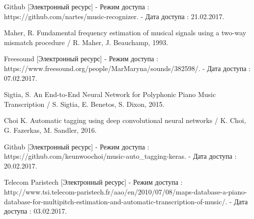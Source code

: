 \documentclass[oneside, final, 12pt]{extarticle}
\begin{document}
\begin{thebibliography}{0}
    Github [Электронный ресурс] - Режим доступа :
    https://github.com/nartes/music-recognizer. -
    Дата доступа : 21.02.2017.

   Maher, R. Fundamental frequency estimation of musical signals
    using a two-way mismatch procedure / R. Maher, J. Beauchamp, 1993.

    Freesound [Электронный ресурс] - Режим доступа :
    https://www.freesound.org/people/MarMaryna/sounds/382598/. -
    Дата доступа : 07.02.2017.

    Sigtia, S. An End-to-End Neural Network for Polyphonic Piano Music
    Transcription / S. Sigtia, E. Benetos, S. Dixon, 2015.


    Choi K. Automatic tagging using deep convolutional neural networks /
    K. Choi, G. Fazerkas, M. Sandler, 2016.

    Github [Электронный ресурс] - Режим доступа :
    https://github.com/keunwoochoi/music-auto\_tagging-keras. -
    Дата доступа : 20.02.2017.

    Telecom Paristech [Электронный ресурс] - Режим доступа :
    http://www.tsi.telecom-paristech.fr/aao/en/2010/07/08/maps-database-a-piano-database-for-multipitch-estimation-and-automatic-transcription-of-music/. -
    Дата доступа : 03.02.2017.

\end{thebibliography}






\end{document}

